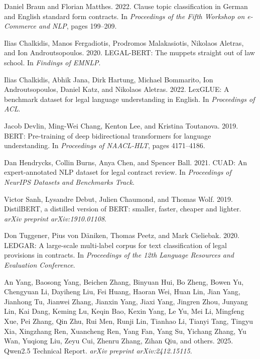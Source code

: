 \documentclass[11pt]{article}
\begin{document}

\begin{thebibliography}{}

Daniel Braun and Florian Matthes. 2022.
\newblock Clause topic classification in German and English standard form contracts.
\newblock In \textit{Proceedings of the Fifth Workshop on e-Commerce and NLP}, pages 199--209.

Ilias Chalkidis, Manos Fergadiotis, Prodromos Malakasiotis, Nikolaos Aletras, and Ion Androutsopoulos. 2020.
\newblock LEGAL-BERT: The muppets straight out of law school.
\newblock In \textit{Findings of EMNLP}.

Ilias Chalkidis, Abhik Jana, Dirk Hartung, Michael Bommarito, Ion Androutsopoulos, Daniel Katz, and Nikolaos Aletras. 2022.
\newblock LexGLUE: A benchmark dataset for legal language understanding in English.
\newblock In \textit{Proceedings of ACL}.

Jacob Devlin, Ming-Wei Chang, Kenton Lee, and Kristina Toutanova. 2019.
\newblock BERT: Pre-training of deep bidirectional transformers for language understanding.
\newblock In \textit{Proceedings of NAACL-HLT}, pages 4171--4186.

Dan Hendrycks, Collin Burns, Anya Chen, and Spencer Ball. 2021.
\newblock CUAD: An expert-annotated NLP dataset for legal contract review.
\newblock In \textit{Proceedings of NeurIPS Datasets and Benchmarks Track}.

Victor Sanh, Lysandre Debut, Julien Chaumond, and Thomas Wolf. 2019.
\newblock DistilBERT, a distilled version of BERT: smaller, faster, cheaper and lighter.
\newblock \textit{arXiv preprint arXiv:1910.01108}.

Don Tuggener, Pius von D{\"a}niken, Thomas Peetz, and Mark Cieliebak. 2020.
\newblock LEDGAR: A large-scale multi-label corpus for text classification of legal provisions in contracts.
\newblock In \textit{Proceedings of the 12th Language Resources and Evaluation Conference}.

An Yang, Baosong Yang, Beichen Zhang, Binyuan Hui, Bo Zheng, Bowen Yu, Chengyuan Li, Dayiheng Liu, Fei Huang, Haoran Wei, Huan Lin, Jian Yang, Jianhong Tu, Jianwei Zhang, Jianxin Yang, Jiaxi Yang, Jingren Zhou, Junyang Lin, Kai Dang, Keming Lu, Keqin Bao, Kexin Yang, Le Yu, Mei Li, Mingfeng Xue, Pei Zhang, Qin Zhu, Rui Men, Runji Lin, Tianhao Li, Tianyi Tang, Tingyu Xia, Xingzhang Ren, Xuancheng Ren, Yang Fan, Yang Su, Yichang Zhang, Yu Wan, Yuqiong Liu, Zeyu Cui, Zhenru Zhang, Zihan Qiu, and others. 2025.
\newblock Qwen2.5 Technical Report.
\newblock \textit{arXiv preprint arXiv:2412.15115}.

\end{thebibliography}
\end{document}

